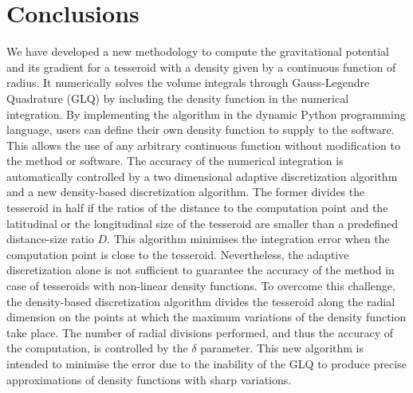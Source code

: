 \documentclass[extra, referee]{gji}
\begin{document}

\section{Conclusions}

We have developed a new methodology to compute the gravitational potential and its
gradient for a tesseroid with a density given by a continuous function of radius.
It numerically solves the volume integrals through Gauss-Legendre Quadrature (GLQ) by
including the density function in the numerical integration.
By implementing the algorithm in the dynamic Python programming language, users can
define their own density function to supply to the software.
This allows the use of any arbitrary continuous function without modification to the
method or software.
The accuracy of the numerical integration is automatically controlled by a two
dimensional adaptive discretization algorithm and a new density-based discretization
algorithm.
The former divides the tesseroid in half if the ratios of the distance to the
computation point and the latitudinal or the longitudinal size of the tesseroid are
smaller than a predefined distance-size ratio $D$.
This algorithm minimises the integration error when the computation point is close to
the tesseroid.
Nevertheless, the adaptive discretization alone is not sufficient to guarantee the
accuracy of the method in case of tesseroids with non-linear density functions.
To overcome this challenge, the density-based discretization algorithm
divides the tesseroid along the radial dimension on the points at which the maximum
variations of the density function take place.
The number of radial divisions performed, and thus the accuracy of the computation, is
controlled by the $\delta$ parameter.
This new algorithm is intended to minimise the error due to the inability of
the GLQ to produce precise approximations of density functions with sharp variations.
\end{document}

